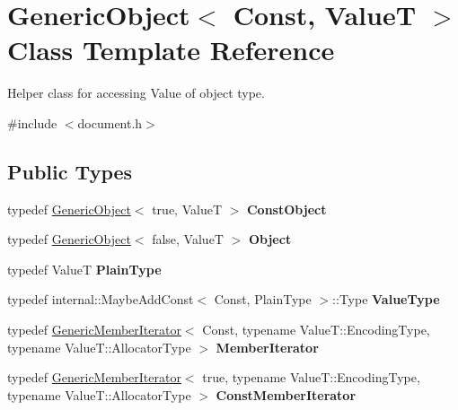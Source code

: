 \hypertarget{class_generic_object}{}\section{Generic\+Object$<$ Const, ValueT $>$ Class Template Reference}
\label{class_generic_object}


Helper class for accessing Value of object type.  




{\ttfamily \#include $<$document.\+h$>$}

\subsection*{Public Types}
\begin{DoxyCompactItemize}
\item 
typedef \hyperlink{class_generic_object}{Generic\+Object}$<$ true, ValueT $>$ {\bfseries Const\+Object}\hypertarget{class_generic_object_aeee588f9a85e88cac89b7c4dfb6b0bd3}{}\label{class_generic_object_aeee588f9a85e88cac89b7c4dfb6b0bd3}

\item 
typedef \hyperlink{class_generic_object}{Generic\+Object}$<$ false, ValueT $>$ {\bfseries Object}\hypertarget{class_generic_object_ae8f5673d0cf8e7ebfd2d4f6ab27b632d}{}\label{class_generic_object_ae8f5673d0cf8e7ebfd2d4f6ab27b632d}

\item 
typedef ValueT {\bfseries Plain\+Type}\hypertarget{class_generic_object_a4c25f4a5f696745c418b91ad9f577f12}{}\label{class_generic_object_a4c25f4a5f696745c418b91ad9f577f12}

\item 
typedef internal\+::\+Maybe\+Add\+Const$<$ Const, Plain\+Type $>$\+::Type {\bfseries Value\+Type}\hypertarget{class_generic_object_a930aa30f89caee7ba7bff60bf9dc21b1}{}\label{class_generic_object_a930aa30f89caee7ba7bff60bf9dc21b1}

\item 
typedef \hyperlink{class_generic_member_iterator}{Generic\+Member\+Iterator}$<$ Const, typename Value\+T\+::\+Encoding\+Type, typename Value\+T\+::\+Allocator\+Type $>$ {\bfseries Member\+Iterator}\hypertarget{class_generic_object_a1f531d70f8d57ed30199ac445b5935e6}{}\label{class_generic_object_a1f531d70f8d57ed30199ac445b5935e6}

\item 
typedef \hyperlink{class_generic_member_iterator}{Generic\+Member\+Iterator}$<$ true, typename Value\+T\+::\+Encoding\+Type, typename Value\+T\+::\+Allocator\+Type $>$ {\bfseries Const\+Member\+Iterator}\hypertarget{class_generic_object_af16706c0ad32b957c56e7d0541628cd5}{}\label{class_generic_object_af16706c0ad32b957c56e7d0541628cd5}


\end{DoxyCompactItemize}
